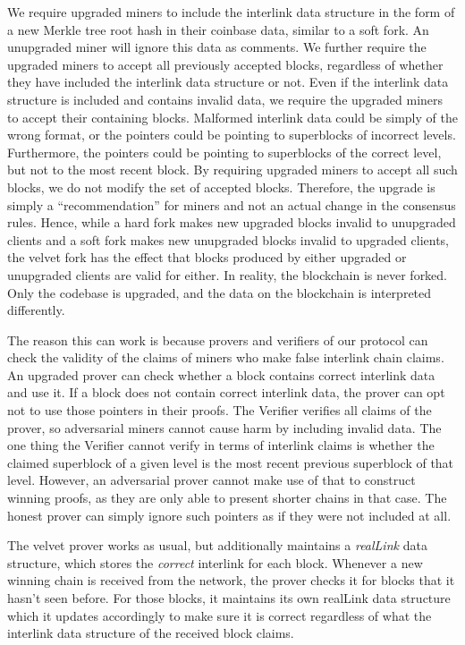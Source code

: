We require upgraded miners to include the interlink data structure in the form
of a new Merkle tree root hash in their coinbase data, similar to a soft fork.
An unupgraded miner will ignore this data as comments. We further require the
upgraded miners to accept all previously accepted blocks, regardless of whether
they have included the interlink data structure or not. Even if the interlink
data structure is included and contains invalid data, we require the upgraded
miners to accept their containing blocks. Malformed interlink data could be
simply of the wrong format, or the pointers could be pointing to superblocks of
incorrect levels. Furthermore, the pointers could be pointing to superblocks of
the correct level, but not to the most recent block. By requiring upgraded
miners to accept all such blocks, we do not modify the set of accepted blocks.
Therefore, the upgrade is simply a ``recommendation'' for miners and not an
actual change in the consensus rules. Hence, while a hard fork makes new
upgraded blocks invalid to unupgraded clients and a soft fork makes new
unupgraded blocks invalid to upgraded clients, the velvet fork has the effect
that blocks produced by either upgraded or unupgraded clients are valid for
either. In reality, the blockchain is never forked. Only the codebase is
upgraded, and the data on the blockchain is interpreted differently.

The reason this can work is because provers and verifiers of our protocol can
check the validity of the claims of miners who make false interlink chain
claims. An upgraded prover can check whether a block contains correct interlink
data and use it. If a block does not contain correct interlink data, the prover
can opt not to use those pointers in their proofs. The Verifier verifies all
claims of the prover, so adversarial miners cannot cause harm by including
invalid data. The one thing the Verifier cannot verify in terms of interlink
claims is whether the claimed superblock of a given level is the most recent
previous superblock of that level. However, an adversarial prover cannot make
use of that to construct winning proofs, as they are only able to present
shorter chains in that case. The honest prover can simply ignore such pointers
as if they were not included at all.

The velvet prover works as usual, but additionally maintains a \emph{realLink}
data structure, which stores the \emph{correct} interlink for each block.
Whenever a new winning chain is received from the network, the prover checks it
for blocks that it hasn't seen before. For those blocks, it maintains its own
realLink data structure which it updates accordingly to make sure it is correct
regardless of what the interlink data structure of the received block claims.

